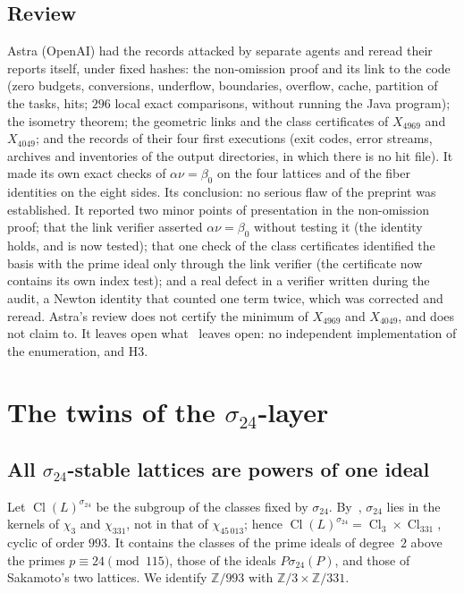 \documentclass[11pt,a4paper]{amsart}
\theoremstyle{plain}
\theoremstyle{definition}
\newcommand{\Z}{\mathbb{Z}}
\DeclareMathOperator{\Cl}{Cl}
\begin{document}
\subsection{Review}\label{subsec:review}
Astra (OpenAI) had the records attacked by separate agents and reread their reports itself, under fixed hashes: the non-omission proof and its link to the code (zero budgets, conversions, underflow, boundaries, overflow, cache, partition of the tasks, hits; $296$ local exact comparisons, without running the Java program); the isometry theorem; the geometric links and the class certificates of $X_{4969}$ and $X_{4049}$; and the records of their four first executions (exit codes, error streams, archives and inventories of the output directories, in which there is no hit file). It made its own exact checks of $\alpha\nu=\beta_0$ on the four lattices and of the fiber identities on the eight sides. Its conclusion: no serious flaw of the preprint was established. It reported two minor points of presentation in the non-omission proof; that the link verifier asserted $\alpha\nu=\beta_0$ without testing it (the identity holds, and is now tested); that one check of the class certificates identified the basis with the prime ideal only through the link verifier (the certificate now contains its own index test); and a real defect in a verifier written during the audit, a Newton identity that counted one term twice, which was corrected and reread. Astra's review does not certify the minimum of $X_{4969}$ and $X_{4049}$, and does not claim to. It leaves open what~\cite[\S5.4]{Gau26} leaves open: no independent implementation of the enumeration, and H3.

\section{The twins of the \texorpdfstring{$\sigma_{24}$}{sigma24}-layer}\label{sec:layer}

\subsection{All $\sigma_{24}$-stable lattices are powers of one ideal}
Let $\Cl(L)^{\sigma_{24}}$ be the subgroup of the classes fixed by $\sigma_{24}$. By~\cite[Prop.~2.5]{Gau26}, $\sigma_{24}$ lies in the kernels of $\chi_3$ and $\chi_{331}$, not in that of $\chi_{45\,013}$; hence $\Cl(L)^{\sigma_{24}}=\Cl_3\times\Cl_{331}$, cyclic of order $993$. It contains the classes of the prime ideals of degree~$2$ above the primes $p\equiv24\pmod{115}$, those of the ideals $P\sigma_{24}(P)$, and those of Sakamoto's two lattices. We identify $\Z/993$ with $\Z/3\times\Z/331$.
\end{document}
